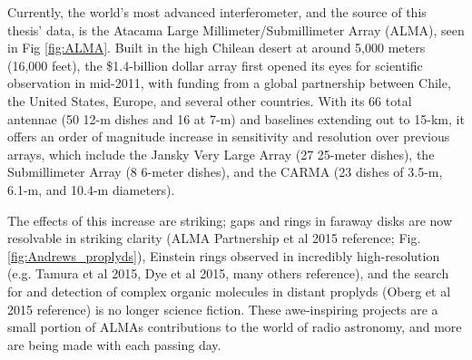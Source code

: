 Currently, the world's most advanced interferometer, and the source of this thesis' data, is the Atacama Large Millimeter/Submillimeter Array (ALMA), seen in Fig \ref{fig:ALMA}. Built in the high Chilean desert at around 5,000 meters (16,000 feet), the \$1.4-billion dollar array first opened its eyes for scientific observation in mid-2011, with funding from a global partnership between Chile, the United States, Europe, and several other countries. With its 66 total antennae (50 12-m dishes and 16 at 7-m) and baselines extending out to 15-km, it offers an order of magnitude increase in sensitivity and resolution over previous arrays, which include the Jansky Very Large Array (27 25-meter dishes), the Submillimeter Array (8 6-meter dishes), and the CARMA (23 dishes of 3.5-m, 6.1-m, and 10.4-m diameters).

\begin{figure}[htp]
  \hspace*{\fill}%
  \hfill%
  \hspace*{\fill}%
\end{figure}


The effects of this increase are striking; gaps and rings in faraway disks are now resolvable in striking clarity (ALMA Partnership et al 2015 reference; Fig. \ref{fig:Andrews_proplyds}), Einstein rings observed in incredibly high-resolution (e.g. Tamura et al 2015, Dye et al 2015, many others reference), and the search for and detection of complex organic molecules in distant proplyds (Oberg et al 2015 reference) is no longer science fiction. These awe-inspiring projects are a small portion of ALMAs contributions to the world of radio astronomy, and more are being made with each passing day.







